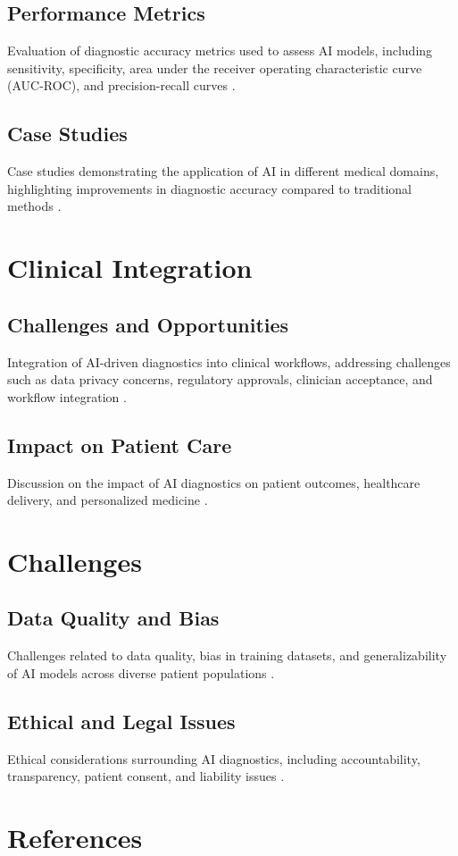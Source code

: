 \documentclass[12pt]{article}
\begin{document}
\subsection{Performance Metrics}
Evaluation of diagnostic accuracy metrics used to assess AI models, including sensitivity, specificity, area under the receiver operating characteristic curve (AUC-ROC), and precision-recall curves \citep{fawcett2006introduction, sondhi2020performance}.

\subsection{Case Studies}
Case studies demonstrating the application of AI in different medical domains, highlighting improvements in diagnostic accuracy compared to traditional methods \citep{gulshan2016development, esteva2019guide}.

\section{Clinical Integration}
\subsection{Challenges and Opportunities}
Integration of AI-driven diagnostics into clinical workflows, addressing challenges such as data privacy concerns, regulatory approvals, clinician acceptance, and workflow integration \citep{char2019deep, obermeyer2016predicting}.

\subsection{Impact on Patient Care}
Discussion on the impact of AI diagnostics on patient outcomes, healthcare delivery, and personalized medicine \citep{rajkomar2018scalable, choi2016doctor}.

\section{Challenges}
\subsection{Data Quality and Bias}
Challenges related to data quality, bias in training datasets, and generalizability of AI models across diverse patient populations \citep{obermeyer2019dissecting, beam2020clinical}.

\subsection{Ethical and Legal Issues}
Ethical considerations surrounding AI diagnostics, including accountability, transparency, patient consent, and liability issues \citep{price2019ethical, miotto2018deep}.

\section*{References}


\end{document}
